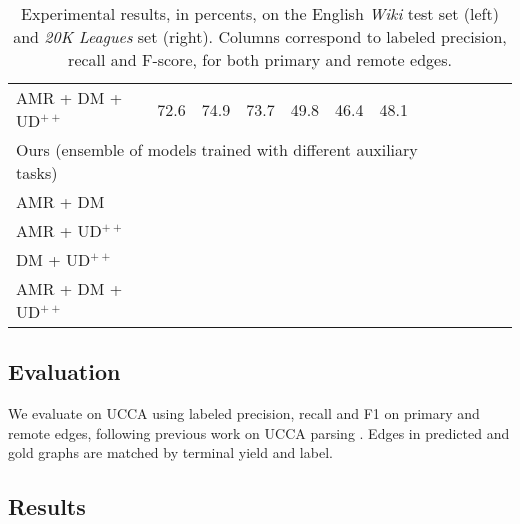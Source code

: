 \documentclass[11pt,a4paper]{article}
\begin{document}
\begin{table*}
\begin{tabular}{l|ccc|ccc||ccc|ccc}
		AMR + DM + UD$^{++}$ & 72.6 & 74.9 & 73.7 & 49.8 & 46.4 & 48.1 \\
		\multicolumn{9}{l}{\small Ours (ensemble of models trained with different auxiliary tasks)} \\
		AMR + DM & \\
		AMR + UD$^{++}$ & \\
		DM + UD$^{++}$ & \\
		AMR + DM + UD$^{++}$ &
	\end{tabular}
	\caption{
	  Experimental results, in percents, on the English \textit{Wiki} test set (left)
	  and \textit{20K Leagues} set (right).
	  Columns correspond to labeled precision, recall and F-score,
	  for both primary and remote edges.
	}
	\label{tab:results}
\end{table*}


\subsection{Evaluation}\label{sec:evaluation}

We evaluate on UCCA using labeled precision, recall and F1 on primary and remote edges,
following previous work on UCCA parsing \cite{hershcovich2017a}.
Edges in predicted and gold graphs are matched by terminal yield and label.


\subsection{Results}\label{sec:results}
\end{document}
